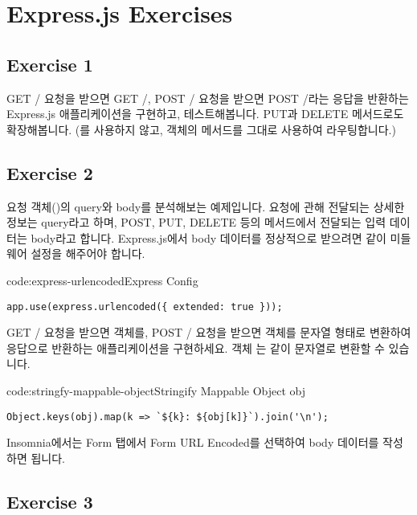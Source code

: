 \section{Express.js Exercises}\label{sect:express-js-exercises}

\subsection*{Exercise 1}
GET / 요청을 받으면 GET /, POST / 요청을 받으면 POST /라는 응답을 반환하는 Express.js 애플리케이션을 구현하고, 테스트해봅니다. PUT과 DELETE 메서드로도 확장해봅니다. (를 사용하지 않고,  객체의 메서드를 그대로 사용하여 라우팅합니다.)

\subsection*{Exercise 2}
요청 객체()의 query와 body를 분석해보는 예제입니다. 요청에 관해 전달되는 상세한 정보는 query라고 하며, POST, PUT, DELETE 등의 메서드에서 전달되는 입력 데이터는 body라고 합니다. Express.js에서 body 데이터를 정상적으로 받으려면 \와 같이 미들웨어 설정을 해주어야 합니다.

\begin{codeenv}{code:express-urlencoded}{Express  Config}\begin{verbatim}
app.use(express.urlencoded({ extended: true }));
\end{verbatim}
\end{codeenv}

GET / 요청을 받으면  객체를, POST / 요청을 받으면  객체를 문자열 형태로 변환하여 응답으로 반환하는 애플리케이션을 구현하세요. 객체 는 \와 같이 문자열로 변환할 수 있습니다.

\begin{codeenv}{code:stringfy-mappable-object}{Stringify Mappable Object obj}\begin{verbatim}
Object.keys(obj).map(k => `${k}: ${obj[k]}`).join('\n');
\end{verbatim}
\end{codeenv}

Insomnia에서는 Form 탭에서 Form URL Encoded를 선택하여 body 데이터를 작성하면 됩니다.

\subsection*{Exercise 3}

